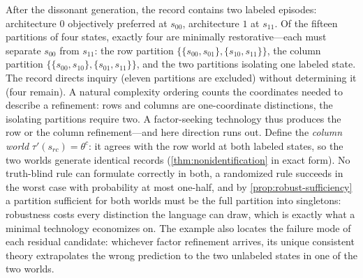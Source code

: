 \begin{excont}
After the dissonant generation, the record contains two labeled episodes:
architecture $0$ objectively preferred at $s_{00}$, architecture $1$ at
$s_{11}$.  Of the fifteen partitions of four states, exactly four are
minimally restorative---each must separate $s_{00}$ from $s_{11}$: the row
partition $\{\{s_{00},s_{01}\},\{s_{10},s_{11}\}\}$, the column partition
$\{\{s_{00},s_{10}\},\{s_{01},s_{11}\}\}$, and the two partitions isolating
one labeled state.  The record directs inquiry (eleven partitions are
excluded) without determining it (four remain).  A natural complexity
ordering counts the coordinates needed to describe a refinement: rows and
columns are one-coordinate distinctions, the isolating partitions require
two.  A factor-seeking technology thus produces the row or the column
refinement---and here direction runs out.  Define the \emph{column world}
$\tau'(s_{rc})=\theta^{c}$: it agrees with the row world at both labeled
states, so the two worlds generate identical records
(\cref{thm:nonidentification} in exact form).  No truth-blind rule can
formulate correctly in both, a randomized rule succeeds in the worst case
with probability at most one-half, and by \cref{prop:robust-sufficiency} a
partition sufficient for both worlds must be the full partition into
singletons: robustness costs every distinction the language can draw, which
is exactly what a minimal technology economizes on.  The example also
locates the failure mode of each residual candidate: whichever factor
refinement arrives, its unique consistent theory extrapolates the wrong
prediction to the two unlabeled states in one of the two worlds.
\end{excont}
